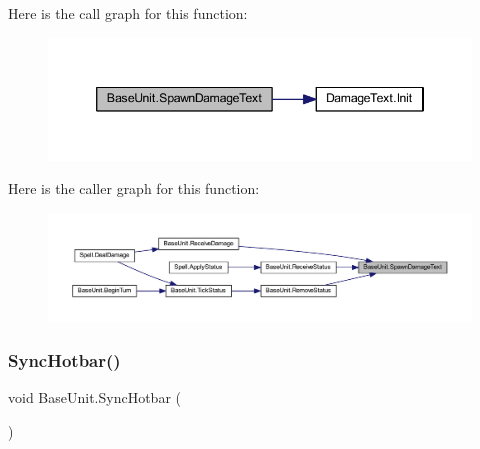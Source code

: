 Here is the call graph for this function\+:
\nopagebreak
\begin{figure}[H]
\begin{center}
\leavevmode
\includegraphics[width=346pt]{class_base_unit_aacee7b4acfdd28621f3a1b66bf8d646a_cgraph}
\end{center}
\end{figure}
Here is the caller graph for this function\+:
\nopagebreak
\begin{figure}[H]
\begin{center}
\leavevmode
\includegraphics[width=350pt]{class_base_unit_aacee7b4acfdd28621f3a1b66bf8d646a_icgraph}
\end{center}
\end{figure}
\mbox{\label{class_base_unit_a15ea3ea70ab13cf8aa582b848cd0531b}} 
\subsubsection{\texorpdfstring{SyncHotbar()}{SyncHotbar()}}
{\footnotesize\ttfamily void Base\+Unit.\+Sync\+Hotbar (\begin{DoxyParamCaption}{ }\end{DoxyParamCaption})}


